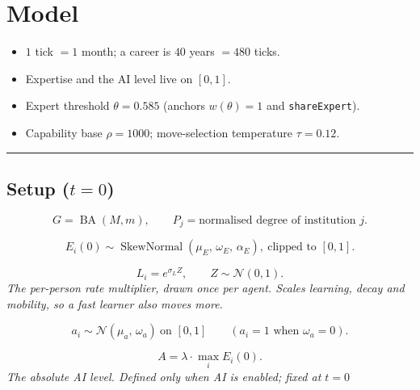 \documentclass[11pt]{article}
\newcommand{\key}[1]{\texttt{\footnotesize #1}}
\newcommand{\eqnote}[1]{{\small\itshape #1}\par\addvspace{4pt}}
\begin{document}
\section*{Model}
\begin{itemize}[leftmargin=1.4em,itemsep=1pt,topsep=3pt]
  \item $1$ tick $=1$ month; a career is $40$ years $=480$ ticks.
  \item Expertise and the AI level live on $[0,1]$.
  \item Expert threshold $\theta = 0.585$ (anchors $w(\theta)=1$ and \key{shareExpert}).
  \item Capability base $\rho = 1000$; move-selection temperature $\tau = 0.12$.
\end{itemize}

\bigskip
\hrule
\medskip


\subsection*{Setup ($t = 0$)}

\begin{equation}\label{eq:E1}
  G = \operatorname{BA}(M, m), \qquad
  P_j = \text{normalised degree of institution } j .
\end{equation}

\begin{equation}\label{eq:E2}
  E_i(0) \sim \operatorname{SkewNormal}(\mu_E,\, \omega_E,\, \alpha_E),
  \ \text{clipped to } [0,1].
\end{equation}

\begin{equation}\label{eq:E3}
  L_i = e^{\sigma_L Z}, \qquad Z \sim \mathcal{N}(0,1).
\end{equation}
\eqnote{The per-person rate multiplier, drawn once per agent. Scales learning, decay \emph{and} mobility, so a fast learner also moves more.}

\begin{equation}\label{eq:E4}
  a_i \sim \mathcal{N}(\mu_a,\, \omega_a) \ \text{on } [0,1]
  \qquad (a_i = 1 \text{ when } \omega_a = 0).
\end{equation}

\begin{equation}\label{eq:E5}
  A = \lambda \cdot \max_i E_i(0).
\end{equation}
\eqnote{The absolute AI level. Defined only when AI is enabled; fixed at $t=0$}
\end{document}
